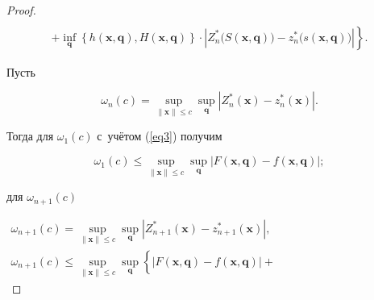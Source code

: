 \begin{proof}
\begin{multline}
\\

\left.+

\inf \limits_{\boldsymbol q} \left\{ h(\boldsymbol x, \boldsymbol q), H(\boldsymbol x, \boldsymbol q) \right\}\cdot\left| 

Z_n^\ast \bigl(S(\boldsymbol x, \boldsymbol q)\bigr)-z_n^\ast \bigl(s(\boldsymbol x, \boldsymbol q)\bigr) \right| 

\right\}.

\end{multline}



Пусть

\[

\omega _n (c)=

\sup \limits_{\| \boldsymbol x \|\leqslant c} 

\sup \limits_{\boldsymbol q} \left| Z_n^\ast (\boldsymbol x)-z_n^\ast (\boldsymbol x) \right|.

\]

Тогда для $\omega _1 (c)$ с~учётом (\ref{eq3}) получим

\[

\omega _1 (c)\leqslant \sup \limits_{\left\| {\boldsymbol x} 

\right\|\leqslant c} \sup \limits_{\boldsymbol q} \left| F(\boldsymbol x, \boldsymbol q)-

f(\boldsymbol x, \boldsymbol q) \right|;

\]

для $\omega _{n+1} (c)$

\begin{gather*}

\omega _{n+1} (c)=

\sup \limits_{\| \boldsymbol x\|\leqslant c} 

\sup \limits_{\boldsymbol q} \left| Z_{n+1}^\ast (\boldsymbol x)-z_{n+1}^\ast (\boldsymbol x) \right|,

\\

\omega _{n+1} (c)\leqslant 

\sup \limits_{\| \boldsymbol x \|\leqslant c} 

\sup \limits_{\boldsymbol q} 

\left\{ \left| F(\boldsymbol x, \boldsymbol q)-

f(\boldsymbol x, \boldsymbol q) \right|+

\phantom{\inf \limits_{\boldsymbol q}}

\right.\hspace{5cm}


\end{gather*}
\end{proof}
